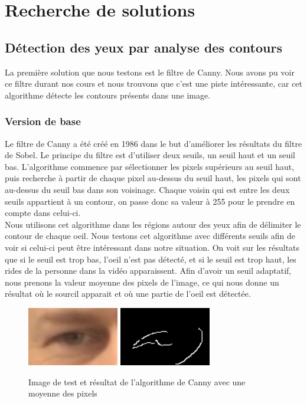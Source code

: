 \section{Recherche de solutions}

\subsection{Détection des yeux par analyse des contours}
La première solution que nous testons est le filtre de Canny. Nous avons pu voir ce filtre durant
nos cours et nous trouvons que c'est une piste intéressante, car cet algorithme détecte les contours
présents dans une image.

\subsubsection{Version de base}
Le filtre de Canny a été créé en 1986 dans le but d'améliorer les résultats du filtre de Sobel.
Le principe du filtre est d'utiliser deux seuils, un seuil haut et un seuil bas. L'algorithme
commence par sélectionner les pixels supérieurs au seuil haut, puis recherche à partir de chaque
pixel au-dessus du seuil haut, les pixels qui sont au-dessus du seuil bas dans son voisinage. 
Chaque voisin qui est entre les deux seuils appartient à un contour, on passe donc sa valeur à
255 pour le prendre en compte dans celui-ci.\\ 

Nous utilisons cet algorithme dans les régions autour des yeux afin de délimiter le contour
de chaque oeil. Nous testons cet algorithme avec différents seuils afin de voir si celui-ci
peut être intéressant dans notre situation. On voit sur les résultats que si le seuil est trop
bas, l'oeil n'est pas détecté, et si le seuil est trop haut, les rides de la personne dans la vidéo
apparaissent. Afin d'avoir un seuil adaptatif, nous prenons la valeur moyenne des pixels de l'image, ce
qui nous donne un résultat où le sourcil apparait et où une partie de l'oeil est détectée.

\begin{figure}[H]
 \center
 \includegraphics[width=4cm]{image/original.png}
 \includegraphics[width=4cm]{image/canny_moyenne.png}
 \caption{Image de test et résultat de l'algorithme de Canny avec une moyenne des pixels}
\end{figure}

